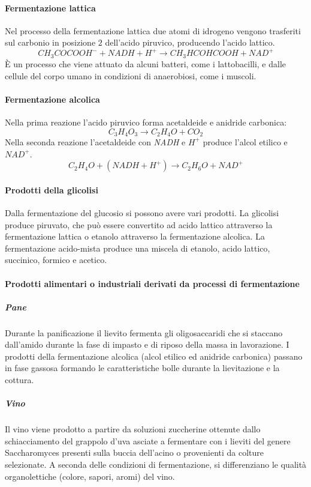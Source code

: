 			\paragraph{Fermentazione lattica}
			Nel processo della fermentazione lattica due atomi di idrogeno vengono trasferiti sul carbonio in posizione $2$ dell'acido piruvico, producendo l'acido lattico.
			\[CH_3COCOOH^- + NADH + H^+ \rightarrow CH_3HCOHCOOH + NAD^+\]
			\`E un processo che viene attuato da alcuni batteri, come i lattobacilli, e dalle cellule del corpo umano in condizioni di anaerobiosi, come i muscoli. 

			\paragraph{Fermentazione alcolica}
			Nella prima reazione l'acido piruvico forma acetaldeide e anidride carbonica:
			\[C_3H_4O_3 \rightarrow C_2H_4O + CO_2\]
			Nella seconda reazione l'acetaldeide con \emph{NADH} e \emph{$H^+$} produce l'alcol etilico e \emph{$NAD^+$}.
			\[C_2H_4O + (NADH + H^+) \rightarrow C_2H_6O + NAD^+\]
			
			\paragraph{Prodotti della glicolisi}
			Dalla fermentazione del glucosio si possono avere vari prodotti. 
			La glicolisi produce piruvato, che pu\`o essere convertito ad acido lattico attraverso la fermentazione lattica o etanolo attraverso la fermentazione alcolica. 
			La fermentazione acido-mista produce una miscela di etanolo, acido lattico, succinico, formico e acetico.

			\paragraph{Prodotti alimentari o industriali derivati da processi di fermentazione}
				
				\subparagraph{Pane}
				Durante la panificazione il lievito fermenta gli oligosaccaridi che si staccano dall'amido durante la fase di impasto e di riposo della massa in lavorazione. 
				I prodotti della fermentazione alcolica (alcol etilico ed anidride carbonica) passano in fase gassosa formando le caratteristiche bolle durante la lievitazione e la cottura.	
				\subparagraph{Vino}
				Il vino viene prodotto a partire da soluzioni zuccherine ottenute dallo schiacciamento del grappolo d'uva asciate a fermentare con i lieviti del genere Saccharomyces presenti sulla buccia dell'acino o provenienti da colture selezionate. 
				A seconda delle condizioni di fermentazione, si differenziano le qualit\`a organolettiche (colore, sapori, aromi) del vino.

